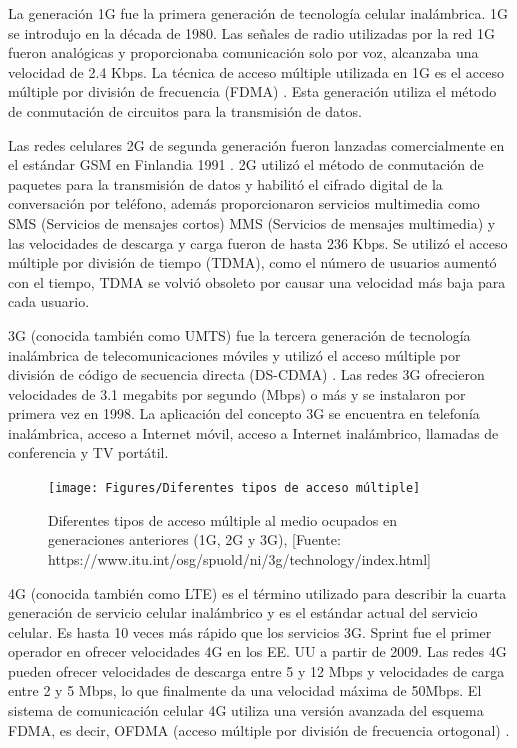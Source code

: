 La generación 1G fue la primera generación de tecnología celular inalámbrica. 1G se introdujo en la década de 1980. Las señales de radio utilizadas por la red 1G fueron analógicas y proporcionaba comunicación solo por voz, alcanzaba una velocidad de 2.4 Kbps. La técnica de acceso múltiple utilizada en 1G es el acceso múltiple por división de frecuencia (FDMA) \parencite{Nair2018}. Esta generación utiliza el método de conmutación de circuitos para la transmisión de datos. \newline

Las redes celulares 2G de segunda generación fueron lanzadas comercialmente en el estándar GSM en Finlandia 1991 \parencite{Nair2018}. 2G utilizó el método de conmutación de paquetes para la transmisión de datos y habilitó el cifrado digital de la conversación por teléfono, además proporcionaron servicios multimedia como SMS (Servicios de mensajes cortos) MMS (Servicios de mensajes multimedia) y las velocidades de descarga y carga fueron de hasta 236 Kbps. Se utilizó el acceso múltiple por división de tiempo (TDMA), como el número de usuarios aumentó con el tiempo, TDMA se volvió obsoleto por causar una velocidad más baja para cada usuario.\newline

3G (conocida también como UMTS) fue la tercera generación de tecnología inalámbrica de telecomunicaciones móviles y utilizó el acceso múltiple por división de código de secuencia directa (DS-CDMA) \parencite{Nair2018}. Las redes 3G ofrecieron velocidades de 3.1 megabits por segundo (Mbps) o más y se instalaron por primera vez en 1998. La aplicación del concepto 3G se encuentra en telefonía inalámbrica, acceso a Internet móvil, acceso a Internet inalámbrico, llamadas de conferencia y TV portátil.\newline

\begin{figure}[th]
\centering
\texttt{[image: Figures/Diferentes tipos de acceso múltiple]}
\decoRule
\caption[Diferentes tipos de acceso múltiple al medio ocupados en generaciones anteriores (1G, 2G y 3G)]{Diferentes tipos de acceso múltiple al medio ocupados en generaciones anteriores (1G, 2G y 3G), [Fuente: https://www.itu.int/osg/spuold/ni/3g/technology/index.html]}
\label{fig:MAs}
\end{figure}

4G (conocida también como LTE) es el término utilizado para describir la cuarta generación de servicio celular inalámbrico y es el estándar actual del servicio celular. Es hasta 10 veces más rápido que los servicios 3G. Sprint fue el primer operador en ofrecer velocidades 4G en los EE. UU a partir de 2009. Las redes 4G pueden ofrecer velocidades de descarga entre 5 y 12 Mbps y velocidades de carga entre 2 y 5 Mbps, lo que finalmente da una velocidad máxima de 50Mbps. El sistema de comunicación celular 4G utiliza una versión avanzada del esquema FDMA, es decir, OFDMA (acceso múltiple por división de frecuencia ortogonal) \parencite{Nair2018}.\newline

